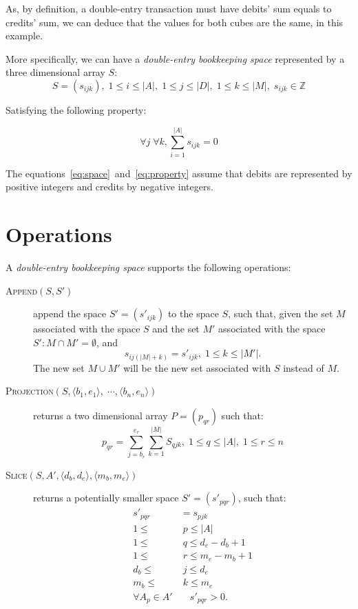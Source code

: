 \documentclass{article}
\begin{document}
As, by definition, a double-entry transaction must have debits' sum
equals to credits' sum, we can deduce that the values for both
cubes are the same, in this example.

More specifically, we can have a \emph{double-entry bookkeeping space} 
represented by a three dimensional array $S$:
\begin{equation}
	\label{eq:space}
	S = \left(s_{ijk}\right), 
	\; 1 \leq i \leq |A|, \; 1 \leq j \leq |D|, \; 1 \leq k \leq |M|, 
	\; s_{ijk} \in \mathbb{Z}
\end{equation}

Satisfying the following property:

\begin{equation}
	\label{eq:property}
	\forall j \; \forall k, \sum_{i=1}^{|A|}{s_{ijk}} = 0
\end{equation}

The equations~\eqref{eq:space}~and~\eqref{eq:property}
assume that debits are represented by positive integers
and credits by negative integers.

\section{Operations}

A \emph{double-entry bookkeeping space} supports the following operations:

\begin{description}
	\item[\textsc{Append}$(S,S')$] append the space
	$S'=\left(s'_{ijk}\right)$ to the space $S$,
		such that, given the set $M$ associated with the space $S$ and
		the set $M'$ associated with the space $S':
		M \cap M' = \emptyset$, and
		\[
			s_{ij(|M|+k)} = s'_{ijk}, \; 1 \leq k \leq |M'|.
		\]
		The new set $M \cup M'$ will be the new set associated with $S$
		instead of $M$.

	\item[\textsc{Projection}$(S, \langle b_1, e_1 \rangle, \; \cdots,
		\langle b_n, e_n \rangle)$] 
		returns a two dimensional array $P=\left(p_{qr}\right)$ such that:
		\[
			p_{qr} = \sum_{j=b_r}^{e_r}{\sum_{k=1}^{|M|}{S_{qjk}}}, 
				\; 1 \leq q \leq |A|, \; 1 \leq r \leq n
		\]

	\item[\textsc{Slice}$(S, A', \langle d_b,d_e \rangle, \langle m_b,m_e \rangle)$] 
		returns a potentially smaller space $S'=\left(s'_{pqr}\right)$, such that:
			\begin{align*}
				s'_{pqr} & = s_{pjk} \\
				1 \leq & \; p \leq |A| \\
				1 \leq & \; q \leq d_e-d_b+1 \\
				1 \leq & \; r \leq m_e-m_b+1 \\
				d_b \leq & \; j \leq d_e \\
				m_b \leq & \; k \leq m_e \\
				\forall A_{p} \in A' & \quad s'_{pqr} > 0.
			\end{align*}

\end{description}
\end{document}
